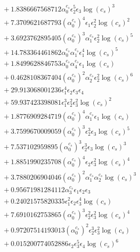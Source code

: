 \documentclass[10pt]{article}
\begin{document}
\begin{align*}
&{}  + 1.8386667568712 \alpha_{0}^{c_s} \epsilon_{2}^{5} \epsilon_{3} \log{\left(c_{s} \right)}^{3} \\
&{}  + 7.3709621687793 \left(\alpha_{0}^{c_s}\right)^{4} \epsilon_{1} \epsilon_{2}^{2} \log{\left(c_{s} \right)}^{2} \\
&{}  + 3.6923762895405 \left(\alpha_{0}^{c_s}\right)^{3} \alpha_{1}^{c_s} \epsilon_{2}^{2} \log{\left(c_{s} \right)}^{5} \\
&{}  + 14.783364461862 \alpha_{0}^{c_s} \alpha_{1}^{c_s} \epsilon_{1}^{4} \log{\left(c_{s} \right)}^{5} \\
&{}  + 1.8499628846753 \alpha_{0}^{c_s} \alpha_{4}^{c_s} \epsilon_{1} \log{\left(c_{s} \right)} \\
&{}  + 0.4628108367404 \left(\alpha_{0}^{c_s}\right)^{2} \alpha_{2}^{c_s} \epsilon_{2}^{2} \log{\left(c_{s} \right)}^{6} \\
&{}  + 29.913068001236 \epsilon_{1}^{4} \epsilon_{2} \epsilon_{3} \epsilon_{4} \\
&{}  + 59.937423398081 \epsilon_{1}^{3} \epsilon_{2}^{2} \epsilon_{3}^{2} \log{\left(c_{s} \right)}^{2} \\
&{}  + 1.8776909284719 \left(\alpha_{0}^{c_s}\right)^{4} \alpha_{1}^{c_s} \epsilon_{1} \log{\left(c_{s} \right)} \\
&{}  + 3.7599670009059 \left(\alpha_{0}^{c_s}\right)^{3} \epsilon_{2}^{3} \epsilon_{3} \log{\left(c_{s} \right)}^{5} \\
&{}  + 7.537102959895 \left(\alpha_{0}^{c_s}\right)^{3} \epsilon_{2}^{3} \epsilon_{3} \log{\left(c_{s} \right)}^{3} \\
&{}  + 1.8851990235708 \left(\alpha_{0}^{c_s}\right)^{4} \epsilon_{2} \epsilon_{3}^{2} \log{\left(c_{s} \right)}^{4} \\
&{}  + 3.7880206904046 \left(\alpha_{0}^{c_s}\right)^{2} \alpha_{1}^{c_s} \alpha_{2}^{c_s} \log{\left(c_{s} \right)}^{3} \\
&{}  + 0.95671981284112 \alpha_{3}^{c_s} \epsilon_{1} \epsilon_{2} \epsilon_{3} \\
&{}  + 0.24021575820335 \epsilon_{1}^{2} \epsilon_{2} \epsilon_{3}^{4} \log{\left(c_{s} \right)} \\
&{}  + 7.6910162753865 \left(\alpha_{0}^{c_s}\right)^{3} \epsilon_{2}^{2} \epsilon_{3}^{2} \log{\left(c_{s} \right)}^{4} \\
&{}  + 0.97207514193013 \left(\alpha_{0}^{c_s}\right)^{2} \epsilon_{2}^{3} \epsilon_{3}^{2} \log{\left(c_{s} \right)} \\
&{}  + 0.015200774052886 \epsilon_{2} \epsilon_{3}^{5} \epsilon_{4} \log{\left(c_{s} \right)}^{6} \\

\end{align*}
\end{document}

